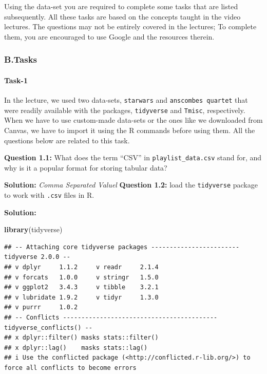 \documentclass[
]{article}
\newenvironment{Shaded}{\begin{snugshade}}{\end{snugshade}}
\newcommand{\FunctionTok}[1]{\textcolor[rgb]{0.13,0.29,0.53}{\textbf{#1}}}
\newcommand{\NormalTok}[1]{#1}
\begin{document}
Using the data-set you are required to complete some tasks that are
listed subsequently. All these tasks are based on the concepts taught in
the video lectures. The questions may not be entirely covered in the
lectures; To complete them, you are encouraged to use Google and the
resources therein.

\hypertarget{b.tasks}{%
\subsubsection{B.Tasks}\label{b.tasks}}

\hypertarget{task-1}{%
\paragraph{Task-1}\label{task-1}}

In the lecture, we used two data-sets, \texttt{starwars} and
\texttt{anscombe\textquotesingle{}s\ quartet} that were readily
available with the packages, \texttt{tidyverse} and \texttt{Tmisc},
respectively. When we have to use custom-made data-sets or the ones like
we downloaded from Canvas, we have to import it using the R commands
before using them. All the questions below are related to this task.

\textbf{Question 1.1:} What does the term ``CSV'' in
\texttt{playlist\_data.csv} stand for, and why is it a popular format
for storing tabular data?

\textbf{Solution:} \emph{Comma Separated Valuel} \textbf{Question 1.2:}
load the \texttt{tidyverse} package to work with \texttt{.csv} files in
R.

\textbf{Solution:}

\begin{Shaded}
\begin{Highlighting}[]
\FunctionTok{library}\NormalTok{(tidyverse)}
\end{Highlighting}
\end{Shaded}

\begin{verbatim}
## -- Attaching core tidyverse packages ------------------------ tidyverse 2.0.0 --
## v dplyr     1.1.2     v readr     2.1.4
## v forcats   1.0.0     v stringr   1.5.0
## v ggplot2   3.4.3     v tibble    3.2.1
## v lubridate 1.9.2     v tidyr     1.3.0
## v purrr     1.0.2     
## -- Conflicts ------------------------------------------ tidyverse_conflicts() --
## x dplyr::filter() masks stats::filter()
## x dplyr::lag()    masks stats::lag()
## i Use the conflicted package (<http://conflicted.r-lib.org/>) to force all conflicts to become errors
\end{verbatim}
\end{document}
